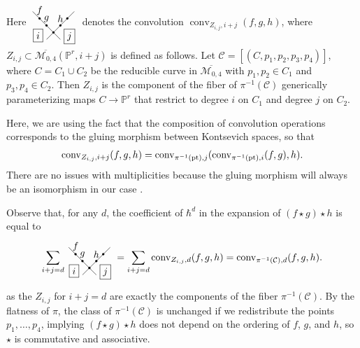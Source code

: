 \documentclass[12pt]{amsart}
\newcommand{\mb}{\mathbb}
\newcommand{\ol}{\overline}
\newcommand{\pt}{{\rm pt}}
\newcommand{\MM}{{\mathcal M}}
\newcommand{\conv}{{\operatorname{conv}}}
\theoremstyle{plain}
\theoremstyle{definition}
\theoremstyle{remark}
\begin{document}
Here $\tikz[baseline=15pt]{ \draw(1,0)--(0,1); \draw(1/2,0)--(3/2,1);\filldraw[black] (1/4,3/4) circle (1pt) node[anchor=south]{$f$}; \filldraw[black] (1/2,1/2) circle (1pt) node[anchor=south]{$g$} node[anchor=north east]{\boxed i};\filldraw[black] (3/4,1/4) circle (1pt) node[anchor=south]{$$}; \filldraw[black] (1,1/2) circle (1pt) node[anchor=south]{$h$} node[anchor=north west]{\boxed j}; \filldraw[black] (1+1/4,3/4) circle (1pt) node[anchor=south]{$$}}$ denotes the convolution $\conv_{Z_{i,j},i+j}(f,g,h)$, where $Z_{i, j}\subset \ol{\MM_{0,4}}(\mb{P}^r,i+j)$ is defined as follows. Let $\mathcal{C} = [(C, p_1, p_2, p_3, p_4)]$, where $C = C_1 \cup C_2$ be the reducible curve in $\ol{\MM_{0,4}}$ with $p_1, p_2 \in C_1$ and $p_3, p_4 \in C_2$. Then $Z_{i, j}$ is the component of the fiber of $\pi^{-1}(\mathcal{C})$ generically parameterizing maps $C \to \mb{P}^r$ that restrict to degree $i$ on $C_1$ and degree $j$ on $C_2$.

Here, we are using the fact that the composition of convolution operations corresponds to the gluing morphism between Kontsevich spaces, so that 
\begin{align*}
\conv_{Z_{i, j}, i+j}(f,g,h)=\conv_{\pi^{-1}(\pt),j}(\conv_{\pi^{-1}(\pt),i}(f,g),h).
\end{align*}
There are no issues with multiplicities because the gluing morphism will always be an isomorphism 
in our case \cite[Lemma 12 (i)]{FP}.

Observe that, for any $d$, the coefficient of $\hbar^d$ in the expansion of $(f \star g) \star h$ is equal to \[\sum_{i+j=d} \tikz[baseline=15pt]{ \draw(1,0)--(0,1); \draw(1/2,0)--(3/2,1);\filldraw[black] (1/4,3/4) circle (1pt) node[anchor=south]{$f$}; \filldraw[black] (1/2,1/2) circle (1pt) node[anchor=south]{$g$} node[anchor=north east]{\boxed i};\filldraw[black] (3/4,1/4) circle (1pt) node[anchor=south]{$$}; \filldraw[black] (1,1/2) circle (1pt) node[anchor=south]{$h$} node[anchor=north west]{\boxed j}; \filldraw[black] (1+1/4,3/4) circle (1pt) node[anchor=south]{$$}} = \sum_{i+j=d} \conv_{Z_{i, j}, d}(f,g,h)=\conv_{\pi^{-1}(\mathcal{C}), d}(f,g,h).\] as the $Z_{i,j}$ for $i + j = d$ are exactly the components of the fiber $\pi^{-1}(\mathcal{C})$. By the flatness of $\pi$, the class of $\pi^{-1}(\mathcal{C})$ is unchanged if we redistribute the points $p_1,\ldots,p_4$, implying $(f \star g) \star h$ does not depend on the ordering of $f$, $g$, and $h$, so $\star$ is commutative and associative.
\end{document}
